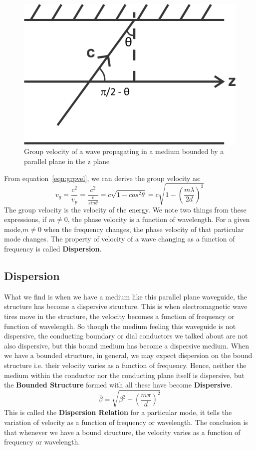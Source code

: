 \begin{figure}[h]
\centering
\includegraphics[scale=1]{./graphics/silas4}
\caption{Group velocity of a wave propagating in a medium bounded by a parallel plane in the z plane}
\label{fig:silas4}
\end{figure}
From equation~\ref{eqn:grpvel}, we can derive the group velocity as:
\begin{dmath*}
v_g = \frac{c^2}{v_p} = \frac{c^2}{\frac{c}{sin\theta}}= c\sqrt{1-cos^{2}\theta} =c\sqrt{1-(\frac{m\lambda}{2d})^{2}}
\end{dmath*}
The group velocity is the velocity of the energy. We note two things from these expressions, if $m \neq 0$, the phase velocity is a function of wavelength. For a given mode,$m \neq 0$ when the frequency changes, the phase velocity of that particular mode changes. The property of velocity of a wave changing as a function of frequency is called \textbf{Dispersion}. 

\subsection{Dispersion}
What we find is when we have a medium like this parallel plane waveguide, the structure has become a dispersive structure. This is when electromagnetic wave tires move in the structure, the velocity becomes a function of frequency or function of wavelength. So though the medium feeling this waveguide is not dispersive, the conducting boundary or dial conductors we talked about are not also dispersive, but this bound medium has become a dispersive medium. When we have a bounded structure, in general, we may expect dispersion on the bound structure i.e. their velocity varies as a function of frequency. Hence, neither the medium within the conductor nor the conducting plane itself is dispersive, but the \textbf{Bounded Structure} formed with all these have become \textbf{Dispersive}.
\begin{equation}
\bar{\beta} = \sqrt{\beta^{2} -\left(\frac{m\pi}{d}\right)^{2}}
\end{equation} 
This is called the \textbf{Dispersion Relation} for a particular mode, it tells the variation of velocity as a function of frequency or wavelength. The conclusion is that whenever we have a bound structure, the velocity varies as a function of frequency or wavelength.

